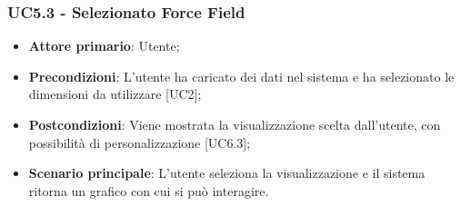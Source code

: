 \subsubsection{UC5.3 - Selezionato Force Field}
\begin{itemize}
	\item \textbf{Attore primario}: Utente;
	\item \textbf{Precondizioni}: L'utente ha caricato dei dati nel sistema e ha selezionato le dimensioni da utilizzare [UC2];
	\item \textbf{Postcondizioni}: Viene mostrata la visualizzazione  scelta dall'utente, con possibilità di personalizzazione [UC6.3];
	\item \textbf{Scenario principale}: L'utente seleziona la visualizzazione  e il sistema ritorna un grafico con cui si può interagire.
\end{itemize}